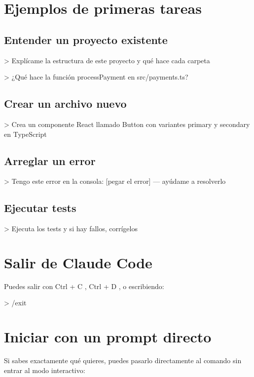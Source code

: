 \documentclass[11pt,a4paper]{book}
\begin{document}
\section{Ejemplos de primeras tareas}
\subsection{Entender un proyecto existente}
\begin{codebox}
> Explícame la estructura de este proyecto y qué hace cada carpeta
\end{codebox}
\begin{codebox}
> ¿Qué hace la función processPayment en src/payments.ts?
\end{codebox}
\subsection{Crear un archivo nuevo}
\begin{codebox}
> Crea un componente React llamado Button con variantes primary y secondary en TypeScript
\end{codebox}
\subsection{Arreglar un error}
\begin{codebox}
> Tengo este error en la consola: [pegar el error] — ayúdame a resolverlo
\end{codebox}
\subsection{Ejecutar tests}
\begin{codebox}
> Ejecuta los tests y si hay fallos, corrígelos
\end{codebox}
\section{Salir de Claude Code}
Puedes salir con Ctrl + C , Ctrl + D , o escribiendo:

\begin{codebox}
> /exit
\end{codebox}
\section{Iniciar con un prompt directo}
Si sabes exactamente qué quieres, puedes pasarlo directamente al comando sin entrar al modo interactivo:
\end{document}
